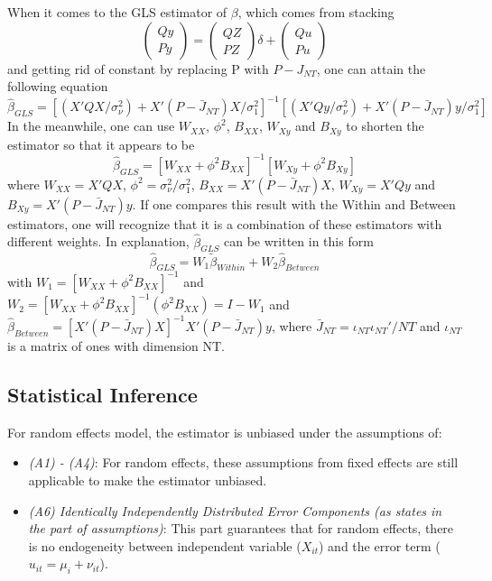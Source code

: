 \documentclass[11pt, a4paper, leqno]{article}
\begin{document}
When it comes to the GLS estimator of $\beta$,  which comes from stacking
    \begin{equation}
    \left(
    \begin{matrix}
    Qy \\ Py
    \end{matrix}
    \right)
    =
    \left(
    \begin{matrix}
    QZ \\ PZ
    \end{matrix}
    \right)
    \delta
    +
    \left(
    \begin{matrix}
    Qu \\ Pu
    \end{matrix}
    \right)
    \end{equation}
and getting rid of constant by replacing P with $P-J_{NT}$, one can attain the following equation
    \begin{equation}
    \widehat\beta_{GLS} = [(X'QX/\sigma_\nu^2) + X'(P - \bar J_{NT})X/\sigma_1^2]^{-1}[(X'Qy/\sigma_\nu^2) + X'(P - \bar J_{NT})y/\sigma_1^2]
    \end{equation}
In the meanwhile, one can use $W_{XX}$, $\phi^2$, $B_{XX}$, $W_{Xy}$ and $B_{Xy}$ to shorten the estimator so that it appears to be
    \begin{equation}
    \widehat\beta_{GLS} = [W_{XX} + \phi^2B_{XX}]^{-1}[W_{Xy} + \phi^2B_{Xy}]
    \end{equation}
where $W_{XX} = X'QX$, $\phi^2 = \sigma_\nu^2 / \sigma_1^2$, $B_{XX} = X'(P - \bar J_{NT})X$, $W_{Xy} = X'Qy$ and $B_{Xy} = X'(P - \bar J_{NT})y$. If one compares this result with the Within and Between estimators, one will recognize that it is a combination of these estimators with different weights. In explanation, $\widehat\beta_{GLS}$ can be written in this form 
    \begin{equation}    
    \widehat\beta_{GLS} = W_1\widetilde\beta_{Within} + W_2\widehat\beta_{Between}
    \end{equation}
with $W_1 = [W_{XX} + \phi^2B_{XX}]^{-1}$ and $W_2 = [W_{XX} + \phi^2B_{XX}]^{-1}(\phi^2B_{XX}) = I - W_1$ and $\hat \beta_{Between} = [X'(P - \bar J_{NT})X]^{-1}X'(P - \bar J_{NT})y$, where $\bar J_{NT} = \iota_{NT} \iota_{NT}' / NT$ and $\iota_{NT}$ is a matrix of ones with dimension NT.

\subsection{Statistical Inference}
For random effects model, the estimator is unbiased under the assumptions of:
\begin{itemize}
    \item \textit {(A1) - (A4)}: For random effects, these assumptions from fixed effects are still applicable to make the estimator unbiased.
    \item \textit{(A6) Identically Independently Distributed Error Components (as states in the part of assumptions)}: This part guarantees that for random effects, there is no endogeneity between independent variable ($X_{it}$) and the error term ($u_{it} = \mu_i + \nu_{it}$).
\end{itemize}
\end{document}
